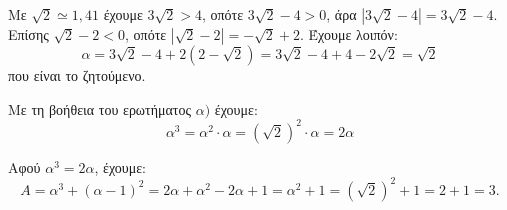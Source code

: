 
\begin{alist}
\item Με $\sqrt{2} \simeq 1,41$ έχουμε $3\sqrt{2} > 4$, οπότε $3\sqrt{2} - 4 > 0$, άρα $|3\sqrt{2} - 4| = 3\sqrt{2} - 4$.
Επίσης $\sqrt{2} - 2 < 0$, οπότε $|\sqrt{2} - 2| = -\sqrt{2} + 2$.
Έχουμε λοιπόν:
\[\alpha = 3\sqrt{2} - 4 + 2(2 - \sqrt{2}) = 3\sqrt{2} - 4 + 4 - 2\sqrt{2} = \sqrt{2}\]
που είναι το ζητούμενο.

\item Με τη βοήθεια του ερωτήματος $\alpha)$ έχουμε:
\[\alpha^3 = \alpha^2 \cdot \alpha = (\sqrt{2})^2 \cdot \alpha = 2\alpha\]

\item Αφού $\alpha^3 = 2\alpha$, έχουμε:
\[A = \alpha^3 + (\alpha - 1)^2 = 2\alpha + \alpha^2 - 2\alpha + 1 = \alpha^2 + 1 = (\sqrt{2})^2 + 1 = 2 + 1 = 3.\]
\end{alist}

